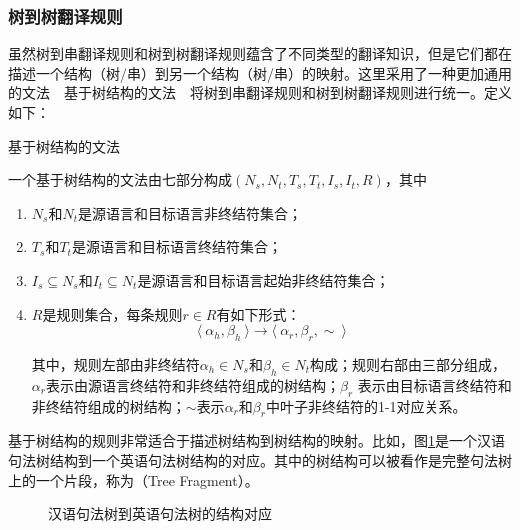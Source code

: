 
\subsubsection{树到树翻译规则}

\parinterval 虽然树到串翻译规则和树到树翻译规则蕴含了不同类型的翻译知识，但是它们都在描述一个结构（树/串）到另一个结构（树/串）的映射。这里采用了一种更加通用的文法\ \dash \ 基于树结构的文法\ \dash \ 将树到串翻译规则和树到树翻译规则进行统一。定义如下：

\vspace{0.5em}
\begin{definition} 基于树结构的文法

{\small
一个基于树结构的文法由七部分构成$(N_s, N_t, T_s, T_t, I_s, I_t, R)$，其中
\begin{enumerate}
\item $N_s$和$N_t$是源语言和目标语言非终结符集合；
\item $T_s$和$T_t$是源语言和目标语言终结符集合；
\item $I_s \subseteq N_s$和$I_t \subseteq N_t$是源语言和目标语言起始非终结符集合；
\item $R$是规则集合，每条规则$r \in R$有如下形式：
\vspace{-1em}
\begin{displaymath}
\langle\  \alpha_h, \beta_h\ \rangle \to \langle\ \alpha_r, \beta_r, \sim\ \rangle
\end{displaymath}

其中，规则左部由非终结符$\alpha_h \in N_s$和$\beta_h \in N_t$构成；规则右部由三部分组成，$\alpha_r$表示由源语言终结符和非终结符组成的树结构；$\beta_r$ 表示由目标语言终结符和非终结符组成的树结构；$\sim$表示$\alpha_r$和$\beta_r$中叶子非终结符的1-1对应关系。
\end{enumerate}
}
\end{definition}

\parinterval 基于树结构的规则非常适合于描述树结构到树结构的映射。比如，图\ref{fig:4-46}是一个汉语句法树结构到一个英语句法树结构的对应。其中的树结构可以被看作是完整句法树上的一个片段，称为{\small{}}（Tree Fragment）。

\begin{figure}[htp]
\centering

\vspace{-2em}
\caption{汉语句法树到英语句法树的结构对应}
\label{fig:4-46}
\end{figure}

